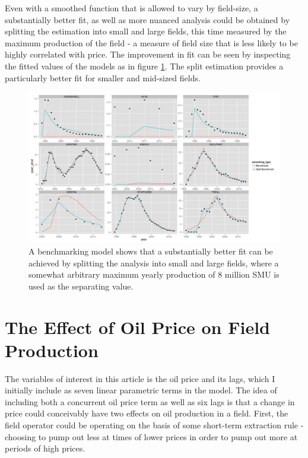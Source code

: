 \documentclass[12pt]{article}
\begin{document}
Even with a smoothed function that is allowed to vary by field-size, a substantially better fit, as well as more nuanced analysis could be obtained by splitting the estimation into small and large fields, this time measured by the maximum production of the field - a measure of field size that is less likely to be highly correlated with price.  The improvement in fit can be seen by inspecting the fitted values of the models as in figure \ref{bench_vs_split}. The split estimation provides a particularly better fit for smaller and mid-sized fields.

\begin{figure}
	\includegraphics[width=1\textwidth]{figures/bench_vs_split_print.png}
	\caption{A benchmarking model shows that a substantially better fit can be achieved by splitting the analysis into small and large fields, where a somewhat arbitrary maximum yearly production of 8 million SMU is used as the separating value.}
	\label{bench_vs_split}
\end{figure}

\section{The Effect of Oil Price on Field Production}

The variables of interest in this article is the oil price and its lags, which I initially include as seven linear parametric terms in the model.  The idea of including both a concurrent oil price term as well as six lags is that a change in price could conceivably have two effects on oil production in a field.  First, the field operator could be operating on the basis of some short-term extraction rule - choosing to pump out less at times of lower prices in order to pump out more at periods of high prices.  
\end{document}
